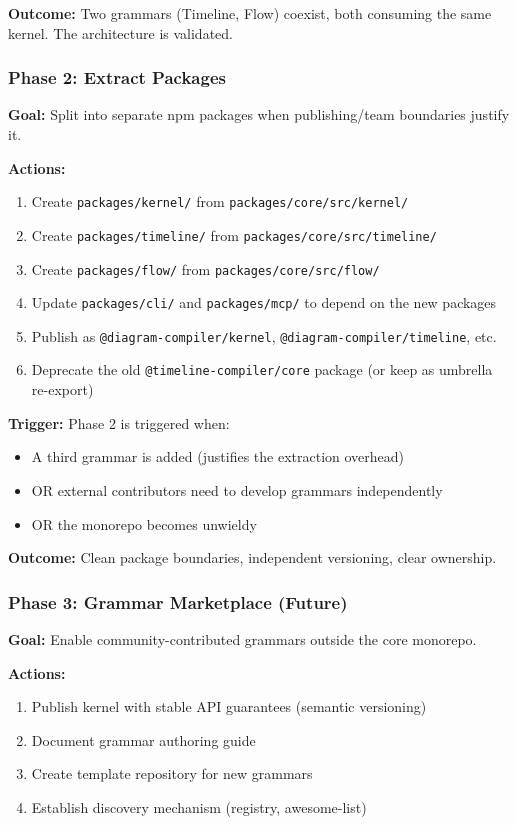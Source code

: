 \textbf{Outcome:} Two grammars (Timeline, Flow) coexist, both consuming the same kernel. The architecture is validated.

\subsubsection{Phase 2: Extract Packages}

\textbf{Goal:} Split into separate npm packages when publishing/team boundaries justify it.

\textbf{Actions:}
\begin{enumerate}
  \item Create \texttt{packages/kernel/} from \texttt{packages/core/src/kernel/}
  \item Create \texttt{packages/timeline/} from \texttt{packages/core/src/timeline/}
  \item Create \texttt{packages/flow/} from \texttt{packages/core/src/flow/}
  \item Update \texttt{packages/cli/} and \texttt{packages/mcp/} to depend on the new packages
  \item Publish as \texttt{@diagram-compiler/kernel}, \texttt{@diagram-compiler/timeline}, etc.
  \item Deprecate the old \texttt{@timeline-compiler/core} package (or keep as umbrella re-export)
\end{enumerate}

\textbf{Trigger:} Phase 2 is triggered when:
\begin{itemize}
  \item A third grammar is added (justifies the extraction overhead)
  \item OR external contributors need to develop grammars independently
  \item OR the monorepo becomes unwieldy
\end{itemize}

\textbf{Outcome:} Clean package boundaries, independent versioning, clear ownership.

\subsubsection{Phase 3: Grammar Marketplace (Future)}

\textbf{Goal:} Enable community-contributed grammars outside the core monorepo.

\textbf{Actions:}
\begin{enumerate}
  \item Publish kernel with stable API guarantees (semantic versioning)
  \item Document grammar authoring guide
  \item Create template repository for new grammars
  \item Establish discovery mechanism (registry, awesome-list)
\end{enumerate}

